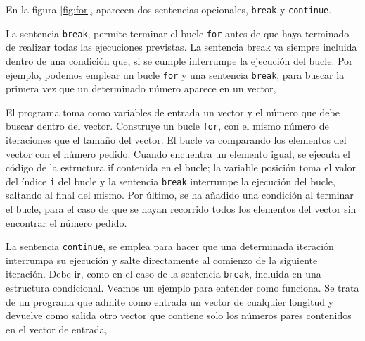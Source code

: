 En la figura \ref{fig:for}, aparecen dos sentencias opcionales, \texttt{break} y \texttt{continue}.

La sentencia \texttt{break}, permite terminar el bucle \texttt{for} antes de que haya terminado de realizar todas las ejecuciones previstas. La sentencia break va siempre incluida dentro de una condición que, si se cumple interrumpe la ejecución del bucle. Por ejemplo, podemos emplear un bucle \texttt{for} y una sentencia \texttt{break}, para buscar la primera vez que un determinado número aparece en un vector,



El programa toma como variables de entrada un vector y el número que debe buscar dentro del vector. Construye un bucle \texttt{for}, con el mismo número de iteraciones que el tamaño del vector. El bucle va comparando los elementos del vector con el número pedido. Cuando encuentra un elemento igual, se ejecuta el código de la estructura if contenida en el bucle; la variable posición toma el valor del índice \texttt{i} del bucle y la sentencia \texttt{break} interrumpe la ejecución del bucle, saltando al final del mismo. Por último, se ha añadido una condición al terminar el bucle, para el caso de que se hayan recorrido todos los elementos del vector sin encontrar el número pedido.

La sentencia \texttt{continue}, se emplea para hacer que una determinada iteración interrumpa su ejecución y salte directamente al comienzo de la siguiente iteración. Debe ir, como en el caso de la sentencia \texttt{break}, incluida en una estructura condicional. Veamos un ejemplo para entender como funciona. Se trata de un programa que admite como entrada un vector de cualquier longitud y devuelve como salida otro vector que contiene solo los números pares contenidos en el vector de entrada,


